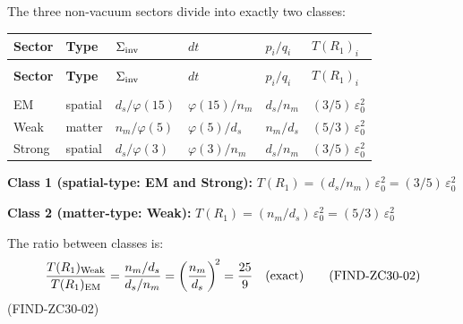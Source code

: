 \documentclass[12pt, a4paper]{article}
\begin{document}
\begin{derivedbox}[title={FIND-ZC30-02:
  Two-Class Structure of Sector Crossing Costs}]
The three non-vacuum sectors divide into exactly two classes:

\medskip
{\small
\setlength{\LTpre}{4pt}
\setlength{\LTpost}{4pt}
\renewcommand{\arraystretch}{1.30}
\begin{longtable}{>{\raggedright\arraybackslash}p{1.7cm}
                  >{\centering\arraybackslash}p{1.5cm}
                  >{\centering\arraybackslash}p{1.8cm}
                  >{\centering\arraybackslash}p{1.8cm}
                  >{\centering\arraybackslash}p{1.4cm}
                  >{\centering\arraybackslash}p{2.5cm}}
\toprule
\textbf{Sector} & \textbf{Type} & $\Sigma_{\rm inv}$ & $dt$ &
  $p_i/q_i$ & $T(R_1)_i$ \\
\midrule
\endfirsthead
\multicolumn{6}{l}{\small\textit{(continued)}}\\[4pt]
\toprule
\textbf{Sector} & \textbf{Type} & $\Sigma_{\rm inv}$ & $dt$ &
  $p_i/q_i$ & $T(R_1)_i$ \\
\midrule
\endhead
\midrule
\multicolumn{6}{r}{\small\textit{(continues)}}\\
\endfoot
\bottomrule
\endlastfoot
EM     & spatial & $d_s/\varphi(15)$ & $\varphi(15)/n_m$ &
  $d_s/n_m$ & $(3/5)\,\varepsilon_0^2$ \\
Weak   & matter  & $n_m/\varphi(5)$  & $\varphi(5)/d_s$  &
  $n_m/d_s$ & $(5/3)\,\varepsilon_0^2$ \\
Strong & spatial & $d_s/\varphi(3)$  & $\varphi(3)/n_m$  &
  $d_s/n_m$ & $(3/5)\,\varepsilon_0^2$ \\
\end{longtable}
}
\vspace{-6pt}

\textbf{Class 1 (spatial-type: EM and Strong):}
$T(R_1) = (d_s/n_m)\,\varepsilon_0^2 = (3/5)\,\varepsilon_0^2$

\textbf{Class 2 (matter-type: Weak):}
$T(R_1) = (n_m/d_s)\,\varepsilon_0^2 = (5/3)\,\varepsilon_0^2$

\medskip
The ratio between classes is:
\[
  \frac{T(R_1)_{\rm Weak}}{T(R_1)_{\rm EM}}
  = \frac{n_m/d_s}{d_s/n_m}
  = \left(\frac{n_m}{d_s}\right)^{\!2}
  = \frac{25}{9}
  \quad\text{(exact)}
  \tag{FIND-ZC30-02}
\]
\hfill\textup{(FIND-ZC30-02)}
\end{derivedbox}
\end{document}
